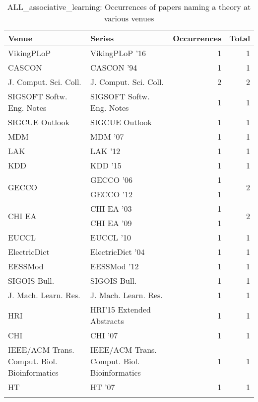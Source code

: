 \begin{table*}[t]
\begin{tabular}{llrr}
Venue & Series & Occurrences & Total\\\hline
\multirow{1}{*}{VikingPLoP } & VikingPLoP '16 & 1 & \multirow{1}{*}{1}\\
\multirow{1}{*}{CASCON } & CASCON '94 & 1 & \multirow{1}{*}{1}\\
\multirow{1}{*}{J. Comput. Sci. Coll.} & J. Comput. Sci. Coll. & 2 & \multirow{1}{*}{2}\\
\multirow{1}{*}{SIGSOFT Softw. Eng. Notes} & SIGSOFT Softw. Eng. Notes & 1 & \multirow{1}{*}{1}\\
\multirow{1}{*}{SIGCUE Outlook} & SIGCUE Outlook & 1 & \multirow{1}{*}{1}\\
\multirow{1}{*}{MDM } & MDM '07 & 1 & \multirow{1}{*}{1}\\
\multirow{1}{*}{LAK } & LAK '12 & 1 & \multirow{1}{*}{1}\\
\multirow{1}{*}{KDD } & KDD '15 & 1 & \multirow{1}{*}{1}\\
\multirow{2}{*}{GECCO } & GECCO '06 & 1 & \multirow{2}{*}{2}\\
& GECCO '12 & 1 &\\
\multirow{2}{*}{CHI EA } & CHI EA '03 & 1 & \multirow{2}{*}{2}\\
& CHI EA '09 & 1 &\\
\multirow{1}{*}{EUCCL } & EUCCL '10 & 1 & \multirow{1}{*}{1}\\
\multirow{1}{*}{ElectricDict } & ElectricDict '04 & 1 & \multirow{1}{*}{1}\\
\multirow{1}{*}{EESSMod } & EESSMod '12 & 1 & \multirow{1}{*}{1}\\
\multirow{1}{*}{SIGOIS Bull.} & SIGOIS Bull. & 1 & \multirow{1}{*}{1}\\
\multirow{1}{*}{J. Mach. Learn. Res.} & J. Mach. Learn. Res. & 1 & \multirow{1}{*}{1}\\
\multirow{1}{*}{HRI} & HRI'15 Extended Abstracts & 1 & \multirow{1}{*}{1}\\
\multirow{1}{*}{CHI } & CHI '07 & 1 & \multirow{1}{*}{1}\\
\multirow{1}{*}{IEEE/ACM Trans. Comput. Biol. Bioinformatics} & IEEE/ACM Trans. Comput. Biol. Bioinformatics & 1 & \multirow{1}{*}{1}\\
\multirow{1}{*}{HT } & HT '07 & 1 & \multirow{1}{*}{1}\\
\caption{ALL_associative_learning: Occurrences of papers naming a theory at various venues}
\end{tabular}
\end{table*}